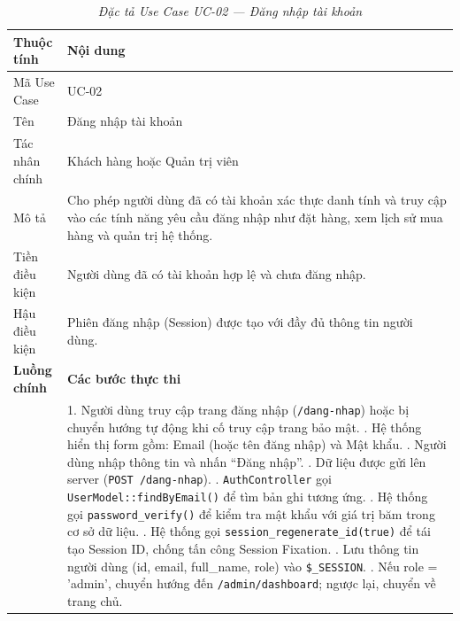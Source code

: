 \documentclass[11pt, a4paper]{article}
\begin{document}
\begin{table}[H]
    \centering
    \small
    \setlength{\tabcolsep}{2pt}
    \renewcommand{\arraystretch}{2.0}
    \caption{\textit{Đặc tả Use Case UC-02 --- Đăng nhập tài khoản}}
    \vspace{0.3cm}
    \begin{tabularx}{\linewidth}{|>{\raggedright\arraybackslash}p{3.3cm}|Y|}
        \hline
        \textbf{Thuộc tính} & \textbf{Nội dung} \\ \hline
        Mã Use Case & UC-02 \\ \hline
        Tên & Đăng nhập tài khoản \\ \hline
        Tác nhân chính & Khách hàng hoặc Quản trị viên \\ \hline
        Mô tả & Cho phép người dùng đã có tài khoản xác thực danh tính và truy cập vào các tính năng yêu cầu đăng nhập như đặt hàng, xem lịch sử mua hàng và quản trị hệ thống. \\ \hline
        Tiền điều kiện & Người dùng đã có tài khoản hợp lệ và chưa đăng nhập. \\ \hline
        Hậu điều kiện & Phiên đăng nhập (Session) được tạo với đầy đủ thông tin người dùng. \\ \hline
        \textbf{Luồng chính} & \textbf{Các bước thực thi} \\ \hline
        & 1. Người dùng truy cập trang đăng nhập (\texttt{/dang-nhap}) hoặc bị chuyển hướng tự động khi cố truy cập trang bảo mật. . Hệ thống hiển thị form gồm: Email (hoặc tên đăng nhập) và Mật khẩu. . Người dùng nhập thông tin và nhấn ``Đăng nhập''. . Dữ liệu được gửi lên server (\texttt{POST /dang-nhap}). . \texttt{AuthController} gọi \texttt{UserModel::findByEmail()} để tìm bản ghi tương ứng. . Hệ thống gọi \texttt{password\_verify()} để kiểm tra mật khẩu với giá trị băm trong cơ sở dữ liệu. . Hệ thống gọi \texttt{session\_regenerate\_id(true)} để tái tạo Session ID, chống tấn công Session Fixation. . Lưu thông tin người dùng (id, email, full\_name, role) vào \texttt{\$\_SESSION}. . Nếu role = 'admin', chuyển hướng đến \texttt{/admin/dashboard}; ngược lại, chuyển về trang chủ. \\ \hline

\end{tabularx}
\end{table}
\end{document}
